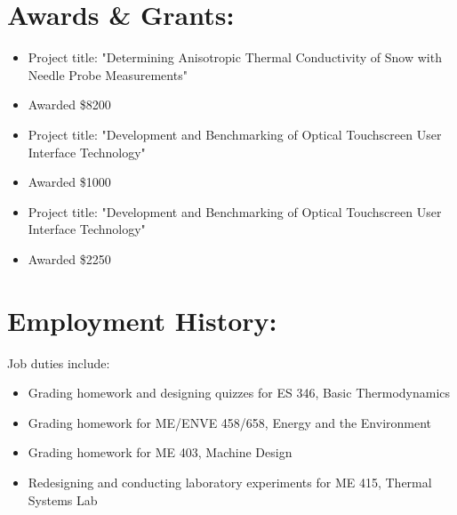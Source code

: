 \documentclass{resume}
\begin{document}
\section{Awards \& Grants:}
    \small
    \begin{itemize}
        \item Project title: "Determining Anisotropic Thermal Conductivity of Snow with Needle Probe Measurements"
        \item Awarded \$8200
    \end{itemize}
    \normalsize

    \small
    \begin{itemize}
        \item Project title: "Development and Benchmarking of Optical Touchscreen User Interface Technology"
        \item Awarded \$1000
    \end{itemize}
    \normalsize

    \small
    \begin{itemize}
        \item Project title: "Development and Benchmarking of Optical Touchscreen User Interface Technology"
        \item Awarded \$2250
    \end{itemize}
    \normalsize
        
\section{Employment History:}
    \normalsize
    Job duties include:
    \small
    \begin{itemize}
        \item Grading homework and designing quizzes for ES 346, Basic Thermodynamics
        \item Grading homework for ME/ENVE 458/658, Energy and the Environment
        \item Grading homework for ME 403, Machine Design
        \item Redesigning and conducting laboratory experiments for ME 415, Thermal Systems Lab
    \end{itemize}
    \normalsize
    \medskip
\end{document}

